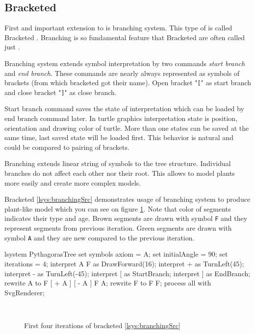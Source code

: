 \subsection{Bracketed \lsystems}

First and important extension to \dzerolsystem is branching system.
This type of \lsystem is called Bracketed \lsystem\cite{PL91}.
Branching is so fundamental feature that Bracketed \lsystems are often called just \lsystems.

Branching system extends symbol interpretation by two commands \emph{start branch} and \emph{end branch}.
These commands are nearly always represented as symbols of brackets (from which bracketed \lsystems got their name).
Open bracket "\texttt{[}" as start branch and close bracket "\texttt{]}" as close branch.

Start branch command saves the state of interpretation which can be loaded by end branch command later.
In turtle graphics interpretation state is position, orientation and drawing color of turtle.
More than one states can be saved at the same time, last saved state will be loaded first.
This behavior is natural and could be compared to pairing of brackets.

Branching extends linear string of symbols to the tree structure.
Individual branches do not affect each other nor their root.
This allows to model plants more easily and create more complex models.

Bracketed \lsystem \ref{lsys:branchingSrc} demonstrates usage of branching system to produce plant-like model which you can see on figure \ref{fig:branching}.
Note that color of segments indicates their type and age.
Brown segments are drawn with symbol \texttt{F} and they represent segments from previous iteration.
Green segments are drawn with symbol \texttt{A} and they are new compared to the previous iteration.

\begin{Lsystem}[label=lsys:branchingSrc,caption={Bracketed \lsystem which creates plant-like model on fig. \ref{fig:branching}}]
lsystem PythagorasTree {
	set symbols axiom = A;
	set initialAngle = 90;
	set iterations = 4;	
	interpret A F as DrawForward(16);
	interpret + as TurnLeft(45);
	interpret - as TurnLeft(-45);
	interpret [ as StartBranch;
	interpret ] as EndBranch;
	rewrite A to F [ + A ] [ - A ] F A;
	rewrite F to F F;
}
process all with SvgRenderer;
\end{Lsystem}

\begin{figure}[ht]
	\centering
	 ~
	 ~
	 ~
	\caption{First four iterations of bracketed \lsystem \ref{lsys:branchingSrc}}
	\label{fig:branching}
\end{figure}



